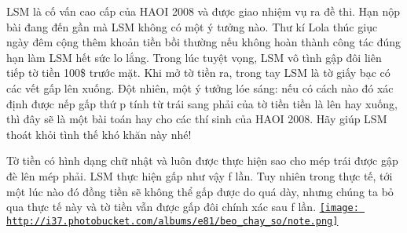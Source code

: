 LSM là cố vấn cao cấp của HAOI 2008 và được giao nhiệm vụ ra đề thi. Hạn nộp bài đang đến gần mà LSM không có một ý tưởng nào. Thư kí Lola thúc giục ngày đêm cộng thêm khoản tiền bồi thường nếu không hoàn thành công tác đúng hạn làm LSM hết sức lo lắng. Trong lúc tuyệt vọng, LSM vô tình gập đôi liên tiếp tờ tiền 100\$ trước mặt. Khi mở tờ tiền ra, trong tay LSM là tờ giấy bạc có các vết gấp lên xuống. Đột nhiên, một ý tưởng lóe sáng: nếu có cách nào đó xác định được nếp gấp thứ p tính từ trái sang phải của tờ tiền tiền là lên hay xuống, thì đây sẽ là một bài toán hay cho các thí sinh của HAOI 2008. Hãy giúp LSM thoát khỏi tình thế khó khăn này nhé!  

   Tờ tiền có hình dạng chữ nhật và luôn được thực hiện sao cho mép trái được gập đè lên mép phải. LSM thực hiện gấp như vậy f lần. Tuy nhiên trong thực tế, tới một lúc nào đó đồng tiền sẽ không thể gấp được do quá dày, nhưng chúng ta bỏ qua thực tế này và tờ tiền vẫn được gấp đôi chính xác sau f lần.  \href{http://s37.photobucket.com/albums/e81/beo_chay_so/?action=view&amp;current=note.png}{
\texttt{[image: http://i37.photobucket.com/albums/e81/beo\_chay\_so/note.png]}}

\